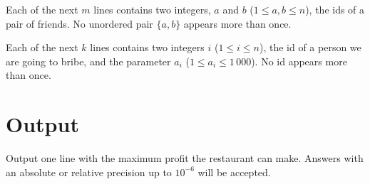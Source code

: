 Each of the next $m$ lines contains two integers, $a$ and $b$
($1 \leq a,b \leq n$), the ids of a pair of friends. No unordered pair
$\{a,b\}$ appears more than once.

Each of the next $k$ lines contains two integers $i$
($1 \leq i \leq n$), the id of a person we are going to bribe, and the
parameter $a_i$ ($1 \leq a_i \leq 1\,000$). No id appears more than
once.

\section*{Output}

Output one line with the maximum profit the restaurant can
make. Answers with an absolute or relative precision up to $10^{-6}$
will be accepted.

